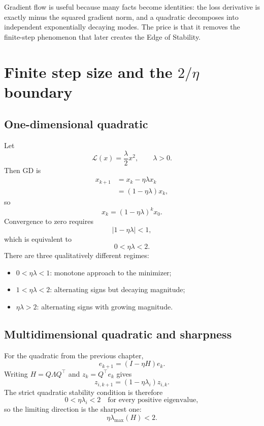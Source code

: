 \documentclass[11pt,a4paper,oneside,openany]{memoir}
\theoremstyle{definition}
\begin{document}
\begin{presentbox}
Gradient flow is useful because many facts become identities: the loss derivative is exactly minus the squared gradient norm, and a quadratic decomposes into independent exponentially decaying modes.  The price is that it removes the finite-step phenomenon that later creates the Edge of Stability.
\end{presentbox}

\chapter{Finite step size and the $2/\eta$ boundary}

\section{One-dimensional quadratic}
Let
\[
\mathcal L(x)=\frac{\lambda}{2}x^2,\qquad \lambda>0.
\]
Then GD is
\begin{align*}
x_{k+1}
&=x_k-\eta\lambda x_k\\
&=(1-\eta\lambda)x_k,
\end{align*}
so
\[
x_k=(1-\eta\lambda)^k x_0.
\]
Convergence to zero requires
\[
|1-\eta\lambda|<1,
\]
which is equivalent to
\[
\boxed{0<\eta\lambda<2.}
\]
There are three qualitatively different regimes:
\begin{itemize}
\item $0<\eta\lambda<1$: monotone approach to the minimizer;
\item $1<\eta\lambda<2$: alternating signs but decaying magnitude;
\item $\eta\lambda>2$: alternating signs with growing magnitude.
\end{itemize}

\section{Multidimensional quadratic and sharpness}
For the quadratic from the previous chapter,
\[
e_{k+1}=(I-\eta H)e_k.
\]
Writing $H=Q\Lambda Q^\top$ and $z_k=Q^\top e_k$ gives
\[
z_{i,k+1}=(1-\eta\lambda_i)z_{i,k}.
\]
The strict quadratic stability condition is therefore
\[
0<\eta\lambda_i<2\quad\text{for every positive eigenvalue},
\]
so the limiting direction is the sharpest one:
\[
\eta\lambda_{\max}(H)<2.
\]
\end{document}
